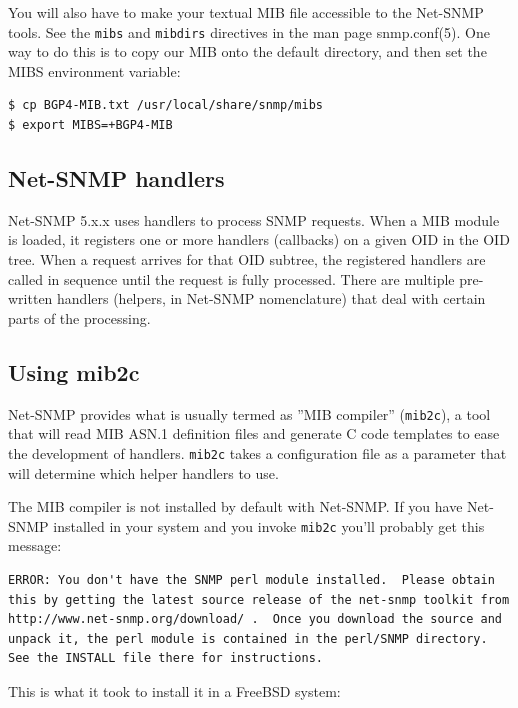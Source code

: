 \documentclass[11pt]{article}
\begin{document}
You will also have to  make your textual MIB file accessible to the Net-SNMP
tools.  See the \texttt{mibs} and \texttt{mibdirs} directives in the man page
snmp.conf(5).  One way to do this is to copy our MIB onto the default
directory, and then set the MIBS environment variable:

\begin{verbatim}
$ cp BGP4-MIB.txt /usr/local/share/snmp/mibs
$ export MIBS=+BGP4-MIB
\end{verbatim}

\subsection{Net-SNMP handlers}

Net-SNMP 5.x.x uses handlers to process SNMP requests.  When a MIB module is
loaded, it registers one or more handlers (callbacks) on a given OID in the OID
tree.  When a request arrives for that OID subtree, the registered handlers
are called in sequence until the request is fully processed.  There are
multiple pre-written handlers (helpers, in Net-SNMP nomenclature) that deal
with certain parts of the processing.

\subsection{Using mib2c}

Net-SNMP provides what is usually termed as ''MIB compiler'' (\texttt{mib2c}),
a tool that will read MIB ASN.1 definition files and generate C code templates
to ease the development of handlers.  \texttt{mib2c} takes a configuration
file as a parameter that will determine which helper handlers to use.

The MIB compiler is not installed by default with Net-SNMP.  If you have
Net-SNMP installed in your system and you invoke \texttt{mib2c} you'll probably
get this message:

\begin{verbatim}
ERROR: You don't have the SNMP perl module installed.  Please obtain
this by getting the latest source release of the net-snmp toolkit from
http://www.net-snmp.org/download/ .  Once you download the source and
unpack it, the perl module is contained in the perl/SNMP directory.
See the INSTALL file there for instructions.
\end{verbatim}

This is what it took to install it in a FreeBSD system:
\end{document}
